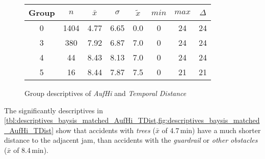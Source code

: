 \begin{figure}[ht!]
	\centering
	\begin{minipage}{0.5\textwidth}
		\tiny
		\setlength{\tabcolsep}{4pt}
		\centering
		\begin{tabular}{c|c|c|c|c|c|c|c}
			\toprule
			Group & $n$ & $\bar{x}$ & $\sigma$ & $\tilde{x}$ & $min$ & $max$ & $\Delta$ \\
			\midrule
			0 & 1404 & 4.77 & 6.65 & 0.0 & 0 & 24 & 24 \\ 
			3 & 380  & 7.92 & 6.87 & 7.0 & 0 & 24 & 24 \\ 
			4 & 44   & 8.43 & 8.13 & 7.0 & 0 & 24 & 24 \\ 
			5 & 16   & 8.44 & 7.87 & 7.5 & 0 & 21 & 21 \\ 
			\bottomrule
		\end{tabular}
		\label{tbl:descriptives_baysis_matched_AufHi_TDist}
	\end{minipage}%
	\begin{minipage}{0.55\textwidth}
		\data 
        \pgfplotstablesort[sort key=mean, sort cmp=float >]{\datasorted}{\data}
        \tiny
        \centering
		\label{fig:descriptives_baysis_matched_AufHi_TDist}
	\end{minipage}%
	\caption{Group descriptives of \textit{AufHi} and \textit{Temporal Distance}}
\end{figure}
The significantly descriptives in \cref{tbl:descriptives_baysis_matched_AufHi_TDist,fig:descriptives_baysis_matched_AufHi_TDist} show that accidents with \textit{trees} ($\bar{x}$ of 4.7\,min) have a much shorter distance to the adjacent jam, than accidents with the \textit{guardrail} or \textit{other obstacles} ($\bar{x}$ of 8.4\,min).

